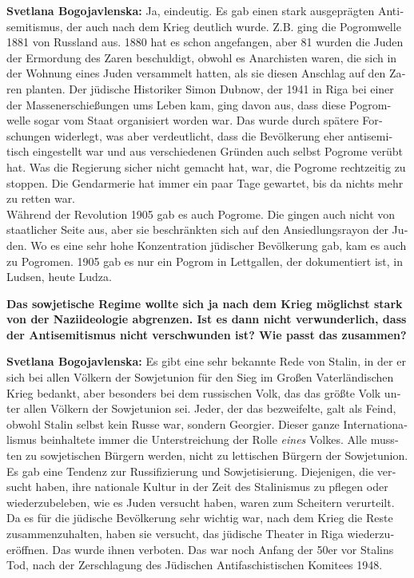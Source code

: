 \begin{otherlanguage}{ngerman}
\textbf{Svetlana Bogojavlenska:} Ja, eindeutig. Es gab einen stark ausgeprägten Antisemitismus, der auch nach dem Krieg deutlich wurde. Z.B. ging die Pogromwelle 1881 von Russland aus. 1880 hat es schon angefangen, aber 81 wurden die Juden der Ermordung des Zaren beschuldigt, obwohl es Anarchisten waren, die sich in der Wohnung eines Juden versammelt hatten, als sie diesen Anschlag auf den Zaren planten. Der jüdische Historiker Simon Dubnow, der 1941 in Riga bei einer der Massenerschießungen ums Leben kam, ging davon aus, dass diese Pogromwelle sogar vom Staat organisiert worden war. Das wurde durch spätere Forschungen widerlegt, was aber verdeutlicht, dass die Bevölkerung eher antisemitisch eingestellt war und aus verschiedenen Gründen auch selbst Pogrome verübt hat. Was die Regierung sicher nicht gemacht hat, war, die Pogrome rechtzeitig zu stoppen. Die Gendarmerie hat immer ein paar Tage gewartet, bis da nichts mehr zu retten war.\\
Während der Revolution 1905 gab es auch Pogrome. Die gingen auch nicht von staatlicher Seite aus, aber sie beschränkten sich auf den Ansiedlungsrayon der Juden. Wo es eine sehr hohe Konzentration jüdischer Bevölkerung gab, kam es auch zu Pogromen. 1905 gab es nur ein Pogrom in Lettgallen, der dokumentiert ist, in Ludsen, heute Ludza. 

\textbf{Das sowjetische Regime wollte sich ja nach dem Krieg möglichst stark von der Naziideologie abgrenzen. Ist es dann nicht verwunderlich, dass der Antisemitismus nicht verschwunden ist? Wie passt das zusammen?}

\textbf{Svetlana Bogojavlenska:} Es gibt eine sehr bekannte Rede von Stalin, in der er sich bei allen Völkern der Sowjetunion für den Sieg im Großen Vaterländischen Krieg bedankt, aber besonders bei dem russischen Volk, das das größte Volk unter allen Völkern der Sowjetunion sei. Jeder, der das bezweifelte, galt als Feind, obwohl Stalin selbst kein Russe war, sondern Georgier. Dieser ganze Internationalismus beinhaltete immer die Unterstreichung der Rolle \textit{eines} Volkes. Alle mussten zu sowjetischen Bürgern werden, nicht zu lettischen Bürgern der Sowjetunion. Es gab eine Tendenz zur Russifizierung und Sowjetisierung. Diejenigen, die versucht haben, ihre nationale Kultur in der Zeit des Stalinismus zu pflegen oder wiederzubeleben, wie es Juden versucht haben, waren zum Scheitern verurteilt. Da es für die jüdische Bevölkerung sehr wichtig war, nach dem Krieg die Reste zusammenzuhalten, haben sie versucht, das jüdische Theater in Riga wiederzueröffnen. Das wurde ihnen verboten. 
Das war noch Anfang der 50er vor Stalins Tod, nach der Zerschlagung des Jüdischen Antifaschistischen Komitees 1948.


\end{otherlanguage}
